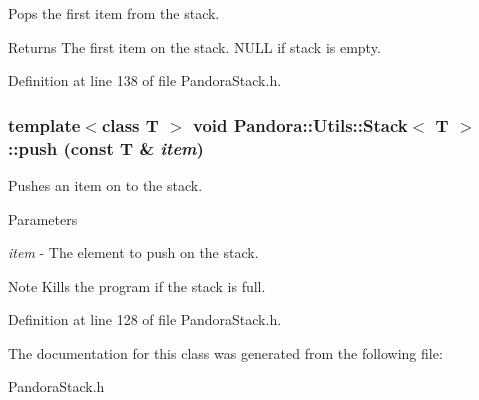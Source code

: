 Pops the first item from the stack. \begin{DoxyReturn}{Returns}
The first item on the stack. NULL if stack is empty. 
\end{DoxyReturn}


Definition at line 138 of file PandoraStack.h.\hypertarget{classPandora_1_1Utils_1_1Stack_a910af8de7eaaa2200515e7efb8251571}{
\subsubsection[{push}]{\setlength{\rightskip}{0pt plus 5cm}template$<$class T $>$ void {\bf Pandora::Utils::Stack}$<$ T $>$::push (const T \& {\em item})}}
\label{classPandora_1_1Utils_1_1Stack_a910af8de7eaaa2200515e7efb8251571}


Pushes an item on to the stack. 
\begin{DoxyParams}{Parameters}
\item[{\em item}]-\/ The element to push on the stack. \end{DoxyParams}
\begin{DoxyNote}{Note}
Kills the program if the stack is full. 
\end{DoxyNote}


Definition at line 128 of file PandoraStack.h.

The documentation for this class was generated from the following file:\begin{DoxyCompactItemize}
\item 
PandoraStack.h\end{DoxyCompactItemize}
